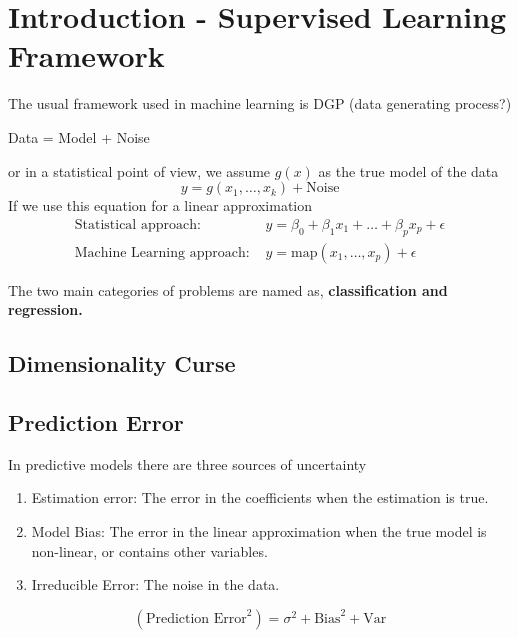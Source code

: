 \section{Introduction - Supervised Learning Framework}
The usual framework used in machine learning is DGP (data generating process?)
\begin{center}
    Data = Model + Noise
\end{center}

or in a statistical point of view, we assume $g(x)$ as the true model of the data
\begin{equation*}
    y = g(x_1,\dots, x_k) + \text{Noise}
\end{equation*}
If we use this equation for a linear approximation
\begin{align*}
    \text{Statistical approach: }& y = \beta_0 + \beta_1 x_1 + \dots + \beta_p x_p + \epsilon\\
    \text{Machine Learning approach: }& y = \text{map}(x_1,\dots,x_p) + \epsilon
\end{align*}

The two main categories of problems are named as, \textbf{classification and regression.}

\subsection{Dimensionality Curse}

\subsection{Prediction Error}
In predictive models there are three sources of uncertainty
\begin{enumerate}
    \item Estimation error: The error in the coefficients when the estimation is true.
    \item Model Bias: The error in the linear approximation when the true model
    is non-linear, or contains other variables.
    \item Irreducible Error: The noise in the data.
\end{enumerate}
\begin{equation*}
    (\text{Prediction Error}^2) = \sigma^2 + \text{Bias}^2 + \text{Var}
\end{equation*}

